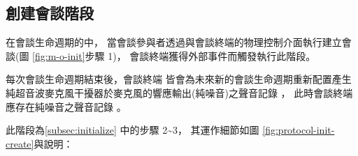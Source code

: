 \subsection{創建會談階段}\label{subsec:protocol-init-create}

    在會談生命週期的中，
當會談參與者透過與會談終端的物理控制介面執行建立會談(圖 \ref{fig:m-o-init}步驟 1)，
會談終端獲得外部事件而觸發執行此階段。

    每次會談生命週期結束後，會談終端 \DEFmeetingbox 皆會為未來新的會談生命週期重新配置產生
純超音波麥克風干擾器於麥克風的響應輸出(純噪音)之聲音記錄 \DEFrecN，
此時會談終端 \DEFmeetingbox 應存在純噪音之聲音記錄 \DEFrecN。

    此階段為\ref{subsec:initialize} 中的步驟 2\textasciitilde3，
其運作細節如圖 \ref{fig:protocol-init-create}與說明：

